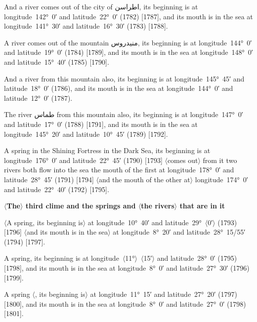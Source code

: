 \documentclass[11pt]{article}
\newcommand{\Pg}[1]{\marginpar{\footnotesize #1}}
\newcommand{\Ang}[1]{\ensuremath{#1}}
\begin{document}
And a river comes out of the city of \textarabic{اطراسن}, its beginning is at longitude~142°~0′ and latitude~22°~0′ (1782) [1787], and its mouth is in the sea at longitude~141°~30′ and latitude~16°~30′ (1783) [1788].

A river comes out of the mountain \textarabic{منيدروس}, its beginning is at longitude~144°~0′ and latitude~19°~0′ (1784) [1789], and its mouth is in the sea at longitude~148°~0′ and latitude~15°~40′ (1785) [1790].

And a river from this mountain also, its beginning is at longitude~145°~45′ and latitude~18°~0′ (1786), and its mouth is in the sea at longitude~144°~0′ and latitude~12°~0′ (1787).

The river \textarabic{طماس} from this mountain also, its beginning is at longitude~147°~0′ and latitude~17°~0′ (1788) [1791], and its mouth is in the sea at longitude~145°~20′ and latitude~10°~45′ (1789) [1792].

A spring in the Shining Fortress in the Dark Sea, its beginning is at longitude~176°~0′ and latitude~22°~45′ (1790) [1793] \Ang{\langle}comes out\Ang{\rangle} from it two rivers both flow into the sea the mouth of the first at longitude~178°~0′ and latitude~28°~45′ (1791) [1794] \Ang{\langle}and the mouth of the other at\Ang{\rangle} longitude~174°~0′ and latitude~22°~40′ (1792) [1795].

\par\medskip\begin{center}\Pg{p. 119}\bfseries \Ang{\langle}The\Ang{\rangle} third clime and the springs and \Ang{\langle}the rivers\Ang{\rangle} that are in it\end{center}\par

\Ang{\langle}A spring, its beginning is\Ang{\rangle} at longitude~10°~40′ and latitude~29°~\Ang{\langle}0′\Ang{\rangle} (1793) [1796] \Ang{\langle}and its mouth is in the sea\Ang{\rangle} at longitude~8°~20′ and latitude~28°~15/55′ (1794) [1797].

A spring, its beginning is at longitude~\Ang{\langle}11°\Ang{\rangle}~\Ang{\langle}15′\Ang{\rangle} and latitude~28°~0′ (1795) [1798], and its mouth is in the sea at longitude~8°~0′ and latitude~27°~30′ (1796) [1799].

A spring \Ang{\langle}, its beginning is\Ang{\rangle} at longitude~11°~15′ and latitude~27°~20′ (1797) [1800], and its mouth is in the sea at longitude~8°~0′ and latitude~27°~0′ (1798) [1801].
\end{document}
